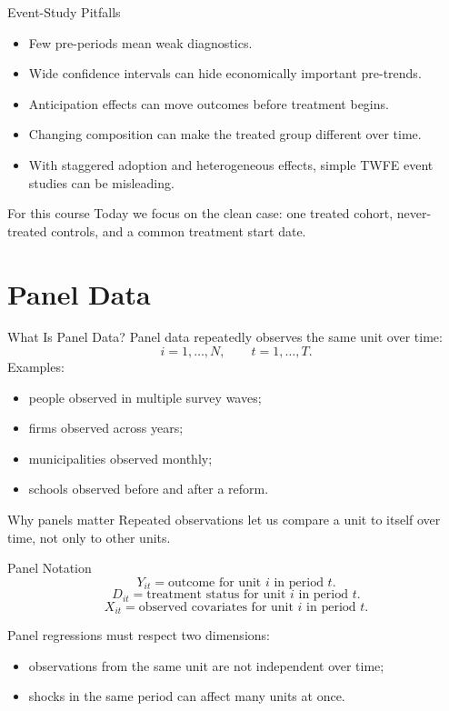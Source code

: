 \documentclass[11pt,aspectratio=169]{beamer}
\begin{document}
\begin{frame}{Event-Study Pitfalls}
  \begin{itemize}
    \item Few pre-periods mean weak diagnostics.
    \item Wide confidence intervals can hide economically important pre-trends.
    \item Anticipation effects can move outcomes before treatment begins.
    \item Changing composition can make the treated group different over time.
    \item With staggered adoption and heterogeneous effects, simple TWFE event studies can be misleading.
  \end{itemize}
  \begin{block}{For this course}
    Today we focus on the clean case: one treated cohort, never-treated controls, and a common treatment start date.
  \end{block}
\end{frame}

\section{Panel Data}

\begin{frame}{What Is Panel Data?}
  Panel data repeatedly observes the same unit over time:
  \[
    i=1,\ldots,N,
    \qquad
    t=1,\ldots,T.
  \]
  Examples:
  \begin{itemize}
    \item people observed in multiple survey waves;
    \item firms observed across years;
    \item municipalities observed monthly;
    \item schools observed before and after a reform.
  \end{itemize}
  \begin{block}{Why panels matter}
    Repeated observations let us compare a unit to itself over time, not only to other units.
  \end{block}
\end{frame}

\begin{frame}{Panel Notation}
  \[
    Y_{it} = \text{outcome for unit } i \text{ in period } t.
  \]
  \[
    D_{it} = \text{treatment status for unit } i \text{ in period } t.
  \]
  \[
    X_{it} = \text{observed covariates for unit } i \text{ in period } t.
  \]

  \vspace{0.4em}
  Panel regressions must respect two dimensions:
  \begin{itemize}
    \item observations from the same unit are not independent over time;
    \item shocks in the same period can affect many units at once.
  \end{itemize}
\end{frame}
\end{document}
